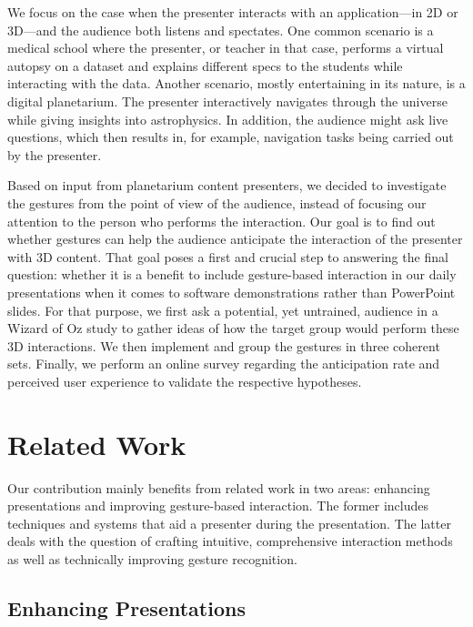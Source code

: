 \documentclass{sigchi}
\begin{document}
We focus on the case when the presenter interacts with an application---in 2D or 3D---and the audience both listens and spectates. One common scenario is a medical school where the presenter, or teacher in that case, performs a virtual autopsy on a dataset and explains different specs to the students while interacting with the data. Another scenario, mostly entertaining in its nature, is a digital planetarium. The presenter interactively navigates through the universe while giving insights into astrophysics. In addition, the audience might ask live questions, which then results in, for example, navigation tasks being carried out by the presenter.

Based on input from planetarium content presenters, we decided to investigate the gestures from the point of view of the audience, instead of focusing our attention to the person who performs the interaction. Our goal is to find out whether gestures can help the audience anticipate the interaction of the presenter with 3D content. That goal poses a first and crucial step to answering the final question: whether it is a benefit to include gesture-based interaction in our daily presentations when it comes to software demonstrations rather than PowerPoint slides. For that purpose, we first ask a potential, yet untrained, audience in a Wizard of Oz study to gather ideas of how the target group would perform these 3D interactions. We then implement and group the gestures in three coherent sets. Finally, we perform an online survey regarding the anticipation rate and perceived user experience to validate the respective hypotheses.



\section{Related Work}

Our contribution mainly benefits from related work in two areas: enhancing presentations and improving gesture-based interaction. The former includes techniques and systems that aid a presenter during the presentation. The latter deals with the question of crafting intuitive, comprehensive interaction methods as well as technically improving gesture recognition.

\subsection{Enhancing Presentations}
\end{document}
